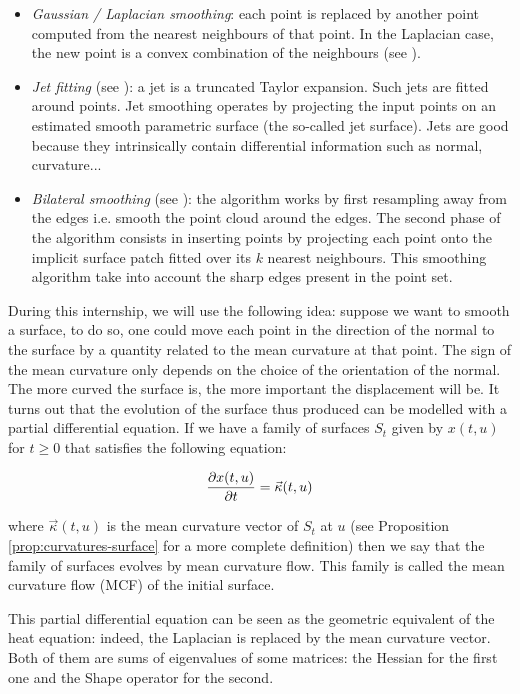 \begin{itemize}
    \item \textit{Gaussian / Laplacian smoothing}: each point is replaced by
        another point computed from the nearest neighbours of that point. In
        the Laplacian case, the new point is a convex combination of the
        neighbours (see \cite{vollmer1999improved}).
    \item \textit{Jet fitting} (see \cite{cazals2005estimating}): a jet is a truncated
        Taylor expansion. Such jets are fitted around points. Jet smoothing
        operates by projecting the input points on an estimated smooth
        parametric surface (the so-called jet surface). Jets are good because
        they intrinsically contain differential information such as normal,
        curvature...
    \item \textit{Bilateral smoothing} (see \cite{huang2013edge}): the algorithm
        works by first resampling away from the edges i.e. smooth the point
        cloud around the edges. The second phase of the algorithm consists in
        inserting points by projecting each point onto the implicit surface
        patch fitted over its $ k $ nearest neighbours. This smoothing algorithm
        take into account the sharp edges present in the point set.
\end{itemize}

During this internship, we will use the following idea: suppose we want to
smooth a surface, to do so, one could move each point in the direction of the
normal to the surface by a quantity related to the mean curvature at that point.
The sign of the mean curvature only depends on the choice of the orientation of
the normal.  The more curved the surface is, the more important the displacement
will be. It turns out that the evolution of the surface thus produced can be
modelled with a partial differential equation. If we have a family of surfaces $
S_t $ given by $ x(t, u) $ for $ t \geq 0 $ that satisfies the following
equation:

$$ \frac{\partial{x(t, u)}}{\partial{t}} = \vec{\kappa}(t, u) $$

where $ \vec{\kappa}(t, u) $ is the mean curvature vector of $ S_t $ at $ u $
(see Proposition \ref{prop:curvatures-surface} for a more complete
definition) then we say that the family of surfaces evolves by
mean curvature flow. This family is called the mean curvature flow (MCF) of the
initial surface.

This partial differential equation can be seen as the geometric equivalent of
the heat equation: indeed, the Laplacian is replaced by the mean curvature
vector. Both of them are sums of eigenvalues of some matrices: the Hessian for
the first one and the Shape operator for the second.

